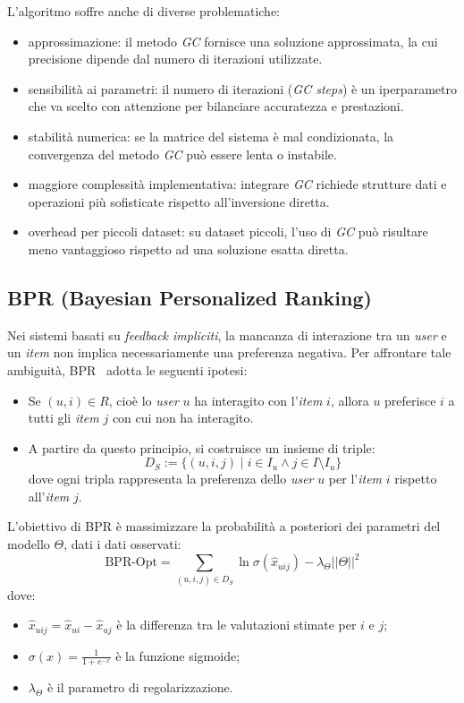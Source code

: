 L'algoritmo soffre anche di diverse problematiche:

\begin{itemize}
    \item approssimazione: il metodo \textit{GC} fornisce una soluzione approssimata, la cui precisione dipende dal numero di iterazioni utilizzate.
    \item sensibilità ai parametri: il numero di iterazioni (\textit{GC steps}) è un iperparametro che va scelto con attenzione per bilanciare accuratezza e prestazioni.
    \item stabilità numerica: se la matrice del sistema è mal condizionata, la convergenza del metodo \textit{GC} può essere lenta o instabile.
    \item maggiore complessità implementativa: integrare \textit{GC} richiede strutture dati e operazioni più sofisticate rispetto all'inversione diretta.
    \item overhead per piccoli dataset: su dataset piccoli, l'uso di \textit{GC} può risultare meno vantaggioso rispetto ad una soluzione esatta diretta.
\end{itemize}

\subsection{BPR (Bayesian Personalized Ranking)}\label{bpr}

Nei sistemi basati su \textit{feedback impliciti}, la mancanza di interazione tra un \textit{user} e un \textit{item} non implica necessariamente una preferenza negativa. Per affrontare tale ambiguità, BPR~\cite{BPR} adotta le seguenti ipotesi:

\begin{itemize}
    \item Se $(u, i) \in R$, cioè lo \textit{user} $u$ ha interagito con l'\textit{item} $i$, allora $u$ preferisce $i$ a tutti gli \textit{item} $j$ con cui non ha interagito.
    \item A partire da questo principio, si costruisce un insieme di triple:
    \[
    D_S := \{(u, i, j) \mid i \in I_u \wedge j \in I \setminus I_u\}
    \]
    dove ogni tripla rappresenta la preferenza dello \textit{user} $u$ per l'\textit{item} $i$ rispetto all'\textit{item} $j$.
\end{itemize}

L'obiettivo di BPR è massimizzare la probabilità a posteriori dei parametri del modello $\Theta$, dati i dati osservati:
\[
\text{BPR-Opt} = \sum_{(u, i, j) \in D_S} \ln \sigma(\hat{x}_{uij}) - \lambda_\Theta ||\Theta||^2
\]
dove:
\begin{itemize}
    \item $\hat{x}_{uij} = \hat{x}_{ui} - \hat{x}_{uj}$ è la differenza tra le valutazioni stimate per $i$ e $j$;
    \item $\sigma(x) = \frac{1}{1 + e^{-x}}$ è la funzione sigmoide;
    \item $\lambda_\Theta$ è il parametro di regolarizzazione.
\end{itemize}

